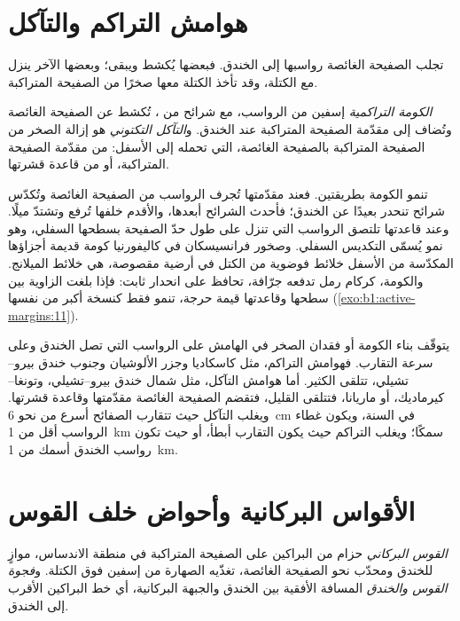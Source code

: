 \section{هوامش التراكم والتآكل}\label{sec:b1:active-margins:prisms}

تجلب الصفيحة الغائصة رواسبها إلى الخندق. فبعضها يُكشط ويبقى؛ وبعضها الآخر ينزل مع الكتلة، وقد تأخذ الكتلة معها صخرًا من الصفيحة المتراكبة.

\begin{definition}\label{def:b1:active-margins:accretionary}
\emph{الكومة التراكمية} إسفين من الرواسب، مع شرائح من ، تُكشط عن الصفيحة الغائصة وتُضاف إلى مقدّمة الصفيحة المتراكبة عند الخندق. و\emph{التآكل التكتوني} هو إزالة الصخر من الصفيحة المتراكبة بالصفيحة الغائصة، التي تحمله إلى الأسفل: من مقدّمة الصفيحة المتراكبة، أو من قاعدة قشرتها.
\end{definition}

تنمو الكومة بطريقتين. فعند مقدّمتها تُجرف الرواسب من الصفيحة الغائصة وتُكدّس شرائح تنحدر بعيدًا عن الخندق؛ فأحدث الشرائح أبعدها، والأقدم خلفها تُرفع وتشتدّ ميلًا. وعند قاعدتها تلتصق الرواسب التي تنزل على طول حدّ الصفيحة بسطحها السفلي، وهو نمو يُسمّى التكديس السفلي. وصخور فرانسيسكان في كاليفورنيا كومة قديمة أجزاؤها المكدّسة من الأسفل خلائط فوضوية من الكتل في أرضية مقصوصة، هي خلائط الميلانج. والكومة، كركام رمل تدفعه جرّافة، تحافظ على انحدار ثابت: فإذا بلغت الزاوية بين سطحها وقاعدتها قيمة حرجة، تنمو فقط كنسخة أكبر من نفسها (\cref{exo:b1:active-margins:11}).

يتوقّف بناء الكومة أو فقدان الصخر في الهامش على الرواسب التي تصل الخندق وعلى سرعة التقارب. فهوامش التراكم، مثل كاسكاديا وجزر الألوشيان وجنوب خندق بيرو–تشيلي، تتلقى الكثير. أما هوامش التآكل، مثل شمال خندق بيرو–تشيلي، وتونغا–كيرماديك، أو ماريانا، فتتلقى القليل، فتقضم الصفيحة الغائصة مقدّمتها وقاعدة قشرتها. ويغلب التآكل حيث تتقارب الصفائح أسرع من نحو \qty{6}{cm} في السنة، ويكون غطاء الرواسب أقل من \qty{1}{km} سمكًا؛ ويغلب التراكم حيث يكون التقارب أبطأ، أو حيث تكون رواسب الخندق أسمك من \qty{1}{km}.

\section{الأقواس البركانية وأحواض خلف القوس}\label{sec:b1:active-margins:arcs}

\begin{definition}\label{def:b1:active-margins:volcanic-arc}
\emph{القوس البركاني} حزام من البراكين على الصفيحة المتراكبة في منطقة الاندساس، موازٍ للخندق ومحدّب نحو الصفيحة الغائصة، تغذّيه الصهارة من إسفين  فوق الكتلة. و\emph{فجوة القوس والخندق} المسافة الأفقية بين الخندق والجبهة البركانية، أي خط البراكين الأقرب إلى الخندق.
\end{definition}

